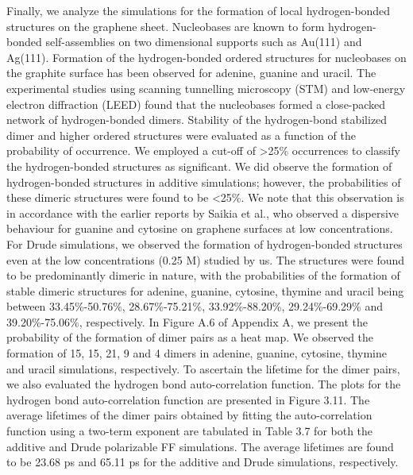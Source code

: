    Finally, we analyze the simulations for the formation of local hydrogen-bonded structures on the graphene sheet. Nucleobases are known to form hydrogen-bonded self-assemblies on two dimensional supports such as Au(111) and Ag(111).\supercite{ciesielski_self-assembly_2016} Formation of the hydrogen-bonded ordered structures for nucleobases on the graphite surface has been observed for adenine,\supercite{freund_structure_1997} guanine\supercite{heckl_two-dimensional_1991} and uracil.\supercite{sowerby_scanning_1997} The experimental studies using scanning tunnelling microscopy (STM) and low-energy electron diffraction (LEED) found that the nucleobases formed a close-packed network of hydrogen-bonded dimers. Stability of the hydrogen-bond stabilized dimer and higher ordered structures were evaluated as a function of the probability of occurrence. We employed a cut-off of >25\% occurrences to classify the hydrogen-bonded structures as significant. We did observe the formation of hydrogen-bonded structures in additive simulations; however, the probabilities of these dimeric structures were found to be <25\%.  We note that this observation is in accordance with the earlier reports by Saikia et al.,\supercite{saikia_hierarchical_2017,saikia_dynamics_2018} who observed a dispersive behaviour for guanine and cytosine on graphene surfaces at low concentrations. For Drude simulations, we observed the formation of hydrogen-bonded structures even at the low concentrations (0.25 M) studied by us. The structures were found to be predominantly dimeric in nature, with the probabilities of the formation of stable dimeric structures for adenine, guanine, cytosine, thymine and uracil being between 33.45\%-50.76\%, 28.67\%-75.21\%, 33.92\%-88.20\%, 29.24\%-69.29\% and 39.20\%-75.06\%, respectively. In Figure A.6 of Appendix A, we present the probability of the formation of dimer pairs as a heat map. We observed the formation of 15, 15, 21, 9 and 4 dimers in adenine, guanine, cytosine, thymine and uracil simulations, respectively. To ascertain the lifetime for the dimer pairs, we also evaluated the hydrogen bond auto-correlation function. The plots for the hydrogen bond auto-correlation function are presented in Figure 3.11. The average lifetimes of the dimer pairs obtained by fitting the auto-correlation function using a two-term exponent are tabulated in Table 3.7 for both the additive and Drude polarizable FF simulations. The average lifetimes are found to be 23.68 ps and 65.11 ps for the additive and Drude simulations, respectively.

